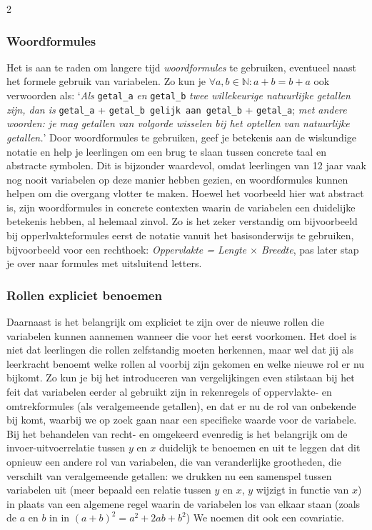 \begin{multicols}{2}
\subsubsection{Woordformules}
Het is aan te raden om langere tijd \textit{woordformules} te gebruiken, eventueel naast het formele gebruik van variabelen. Zo kun je $\forall a, b \in \mathbb{N}: a + b = b + a$ ook verwoorden als: `\textit{Als }\texttt{getal\_a}\textit{ en }\texttt{getal\_b} \textit{ twee willekeurige natuurlijke getallen zijn, dan is} \texttt{getal\_a} + \texttt{getal\_b gelijk aan getal\_b} + \texttt{getal\_a}; \textit{met andere woorden: je mag getallen van volgorde wisselen bij het optellen van natuurlijke getallen.}' Door woordformules te gebruiken, geef je betekenis aan de wiskundige notatie en help je leerlingen om een brug te slaan tussen concrete taal en abstracte symbolen. Dit is bijzonder waardevol, omdat leerlingen van 12 jaar vaak nog nooit variabelen op deze manier hebben gezien, en woordformules kunnen helpen om die overgang vlotter te maken. Hoewel het voorbeeld hier wat abstract is, zijn woordformules in concrete contexten waarin de variabelen een duidelijke betekenis hebben, al helemaal zinvol. Zo is het zeker verstandig om bijvoorbeeld bij opperlvakteformules eerst de notatie vanuit het basisonderwijs te gebruiken, bijvoorbeeld voor een rechthoek: \textit{Oppervlakte = Lengte $\times$ Breedte}, pas later stap je over naar formules met uitsluitend letters.

\subsubsection{Rollen expliciet benoemen}
Daarnaast is het belangrijk om expliciet te zijn over de nieuwe rollen die variabelen kunnen aannemen wanneer die voor het eerst voorkomen. Het doel is niet dat leerlingen die rollen zelfstandig moeten herkennen, maar wel dat jij als leerkracht benoemt welke rollen al voorbij zijn gekomen en welke nieuwe rol er nu bijkomt. Zo kun je bij het introduceren van vergelijkingen even stilstaan bij het feit dat variabelen eerder al gebruikt zijn in rekenregels of oppervlakte- en omtrekformules (als veralgemeende getallen), en dat er nu de rol van onbekende bij komt, waarbij we op zoek gaan naar een specifieke waarde voor de variabele. Bij het behandelen van recht- en omgekeerd evenredig is het belangrijk om de invoer-uitvoerrelatie tussen $y$ en $x$ duidelijk te benoemen en uit te leggen dat dit opnieuw een andere rol van variabelen, die van veranderlijke grootheden, die verschilt van veralgemeende getallen: we drukken nu een samenspel tussen variabelen uit (meer bepaald een relatie tussen $y$ en $x$, $y$ wijzigt in functie van $x$) in plaats van een algemene regel waarin de variabelen los van elkaar staan (zoals de $a$ en $b$ in in  $(a+b)^2=a^2+2ab+b^2$) We noemen dit ook een covariatie.


\end{multicols}
